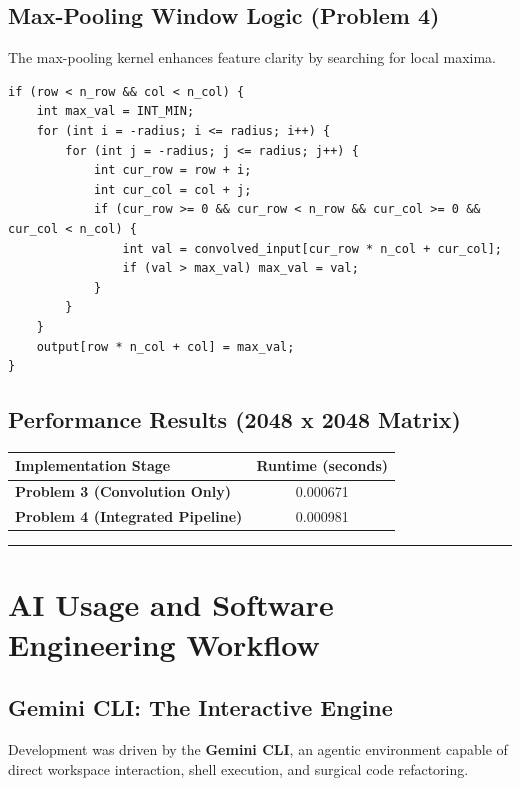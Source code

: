 \documentclass[11pt]{article}
\begin{document}
\subsection*{Max-Pooling Window Logic (Problem 4)}
The max-pooling kernel enhances feature clarity by searching for local maxima.

\begin{lstlisting}
if (row < n_row && col < n_col) {
    int max_val = INT_MIN;
    for (int i = -radius; i <= radius; i++) {
        for (int j = -radius; j <= radius; j++) {
            int cur_row = row + i;
            int cur_col = col + j;
            if (cur_row >= 0 && cur_row < n_row && cur_col >= 0 && cur_col < n_col) {
                int val = convolved_input[cur_row * n_col + cur_col];
                if (val > max_val) max_val = val;
            }
        }
    }
    output[row * n_col + col] = max_val;
}
\end{lstlisting}

\subsection*{Performance Results (2048 x 2048 Matrix)}
\begin{center}
\begin{tabular}{@{}lc@{}}
\toprule
Implementation Stage & Runtime (seconds) \\
\midrule
\textbf{Problem 3 (Convolution Only)} & 0.000671 \\
\textbf{Problem 4 (Integrated Pipeline)} & 0.000981 \\
\bottomrule
\end{tabular}
\end{center}

\noindent\rule{\textwidth}{0.4pt}

\section*{\color{white}AI Usage and Software Engineering Workflow}

\subsection*{Gemini CLI: The Interactive Engine}
Development was driven by the \textbf{Gemini CLI}, an agentic environment capable of direct workspace interaction, shell execution, and surgical code refactoring.
\end{document}
